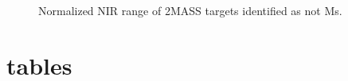 \documentclass[12pt,preprint]{aastex}
\begin{document}
\begin{figure}
	\caption{Normalized NIR range of 2MASS targets identified as not Ms.}
\end{figure}

\clearpage

\section{tables}


\clearpage


\clearpage



\clearpage


\clearpage


\clearpage


\clearpage



\clearpage



%
\clearpage


\clearpage

\end{document}
